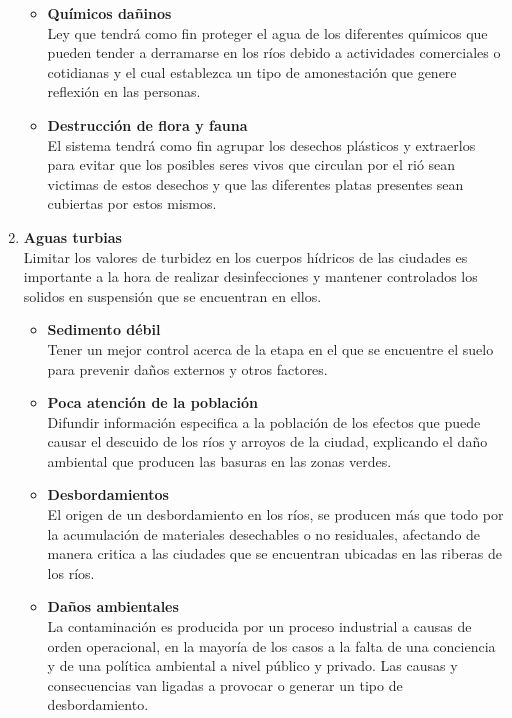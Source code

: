 \begin{enumerate}
\begin{itemize}
		      \item \textbf{Químicos dañinos}\\
		            Ley que tendrá como fin  proteger el agua de los diferentes químicos que pueden tender a derramarse en los ríos debido a actividades comerciales o cotidianas y el cual establezca un tipo de amonestación que genere reflexión en las personas.
		      \item \textbf{Destrucción de flora y fauna}\\
		            El sistema tendrá como fin agrupar los desechos plásticos y extraerlos para evitar que los posibles seres vivos que circulan por el rió sean victimas de estos desechos y que las diferentes platas presentes sean cubiertas por estos mismos.
	      \end{itemize}
	\item \textbf{Aguas turbias}\\
	      Limitar los valores de turbidez en los cuerpos hídricos de las ciudades es importante a la hora de realizar desinfecciones y mantener controlados los solidos en suspensión que se encuentran en ellos.
	      \begin{itemize}
		      \item \textbf{Sedimento débil} \\
		            Tener un mejor control acerca de la etapa en el que se encuentre el suelo para prevenir daños externos y otros factores.
		      \item \textbf{Poca atención de la población}\\
		            Difundir información especifica a la población de los efectos que puede causar el descuido de los ríos y arroyos de la ciudad, explicando el daño ambiental que producen las basuras en las zonas verdes.
		      \item \textbf{Desbordamientos} \\
		            El origen de un desbordamiento en los ríos, se producen más que todo por la acumulación de materiales desechables o no residuales, afectando de manera critica a las ciudades que se encuentran ubicadas en las riberas de los ríos.
		      \item \textbf{Daños ambientales}\\
		            La contaminación es producida por un proceso industrial a causas de orden operacional, en la mayoría de los casos a la falta de una conciencia y de una política ambiental a nivel público y privado. Las causas y consecuencias van ligadas a provocar o generar un tipo de desbordamiento.

\end{itemize}
\end{enumerate}
